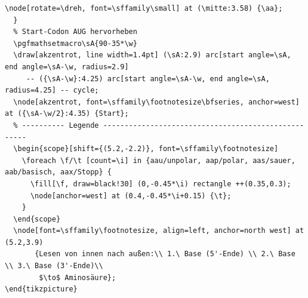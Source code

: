 \begin{lstlisting}[style=latex]
    \node[rotate=\dreh, font=\sffamily\small] at (\mitte:3.58) {\aa};
  }
  % Start-Codon AUG hervorheben
  \pgfmathsetmacro\sA{90-35*\w}
  \draw[akzentrot, line width=1.4pt] (\sA:2.9) arc[start angle=\sA, end angle=\sA-\w, radius=2.9]
     -- ({\sA-\w}:4.25) arc[start angle=\sA-\w, end angle=\sA, radius=4.25] -- cycle;
  \node[akzentrot, font=\sffamily\footnotesize\bfseries, anchor=west] at ({\sA-\w/2}:4.35) {Start};
  % ---------- Legende ----------------------------------------------------
  \begin{scope}[shift={(5.2,-2.2)}, font=\sffamily\footnotesize]
    \foreach \f/\t [count=\i] in {aau/unpolar, aap/polar, aas/sauer, aab/basisch, aax/Stopp} {
      \fill[\f, draw=black!30] (0,-0.45*\i) rectangle ++(0.35,0.3);
      \node[anchor=west] at (0.4,-0.45*\i+0.15) {\t};
    }
  \end{scope}
  \node[font=\sffamily\footnotesize, align=left, anchor=north west] at (5.2,3.9)
       {Lesen von innen nach außen:\\ 1.\ Base (5'-Ende) \\ 2.\ Base \\ 3.\ Base (3'-Ende)\\
        $\to$ Aminosäure};
\end{tikzpicture}
\end{lstlisting}


